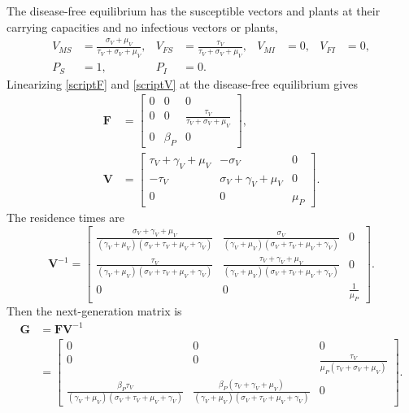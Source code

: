 \documentclass{article}
\newcommand{\mat}[1]{\mathbf{#1}}
\begin{document}
The disease-free equilibrium has the susceptible vectors and plants at
their carrying capacities and no infectious vectors or plants,
\begin{align}
  V_{MS} &= \frac{\sigma_V + \mu_V}{\tau_V + \sigma_V + \mu_V},
  &
  V_{FS} &= \frac{\tau_V}{\tau_V + \sigma_V + \mu_V},
  &
  V_{MI} &= 0,
  &
  V_{FI} &= 0,
  \\
  P_S &= 1,
  &
  P_I &= 0.
\end{align}
Linearizing
\eqref{scriptF} and \eqref{scriptV} at the disease-free equilibrium
gives
\begin{equation}
  \begin{split}
    \mat{F} &=
    \begin{bmatrix}
      0 & 0 & 0
      \\
      0 & 0 & \frac{\tau_V}{\tau_V + \sigma_V + \mu_V}
      \\
      0 & \beta_P & 0
    \end{bmatrix},
    \\
    \mat{V} &=
    \begin{bmatrix}
      \tau_V + \gamma_V + \mu_V & - \sigma_V & 0
      \\
      - \tau_V & \sigma_V + \gamma_V + \mu_V & 0
      \\
      0 & 0 & \mu_P
    \end{bmatrix}.
  \end{split}
\end{equation}
The residence times are
\begin{equation}
  \mat{V}^{-1} =
  \begin{bmatrix}
    \frac{\sigma_V + \gamma_V + \mu_V}
    {(\gamma_V + \mu_V) (\sigma_V + \tau_V + \mu_V + \gamma_V)}
    &  \frac{\sigma_V}
    {(\gamma_V + \mu_V) (\sigma_V + \tau_V + \mu_V + \gamma_V)}
    & 0
    \\
    \frac{\tau_V}
    {(\gamma_V + \mu_V) (\sigma_V + \tau_V + \mu_V + \gamma_V)}
    & \frac{\tau_V + \gamma_V + \mu_V}
    {(\gamma_V + \mu_V) (\sigma_V + \tau_V + \mu_V + \gamma_V)}
    & 0
    \\
    0 & 0 & \frac{1}{\mu_P}
  \end{bmatrix}.
\end{equation}
Then the next-generation matrix is
\begin{equation}
  \begin{split}
    \mat{G} &= \mat{F} \mat{V}^{-1}
    \\
    &=
    \begin{bmatrix}
      0 & 0 & 0
      \\
      0 & 0 & \frac{\tau_V}{\mu_P (\tau_V + \sigma_V + \mu_V)}
      \\
      \frac{\beta_P \tau_V}
      {(\gamma_V + \mu_V) (\sigma_V + \tau_V + \mu_V + \gamma_V)}
      & \frac{\beta_P (\tau_V + \gamma_V + \mu_V)}
      {(\gamma_V + \mu_V) (\sigma_V + \tau_V + \mu_V + \gamma_V)}
      & 0
    \end{bmatrix}.
  \end{split}
\end{equation}
\end{document}
